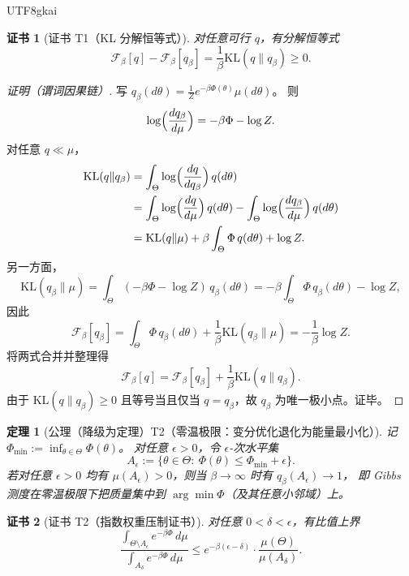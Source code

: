 \documentclass[12pt]{article}
\newtheorem{theorem}{定理}[section]
\newtheorem{Certificate}{证书}[section]
\begin{document}
\begin{CJK*}{UTF8}{gkai}
\begin{Certificate}[证书 T1（KL 分解恒等式）]
\label{cert:tex27-ch8-t1}
对任意可行 $q$，有分解恒等式
\[
  \mathcal{F}_\beta[q]-\mathcal{F}_\beta[q_\beta]
  =\frac{1}{\beta}\mathrm{KL}(q\|q_\beta)\ge 0.
\]
\end{Certificate}

\begin{proof}[证明（谓词因果链）]
写 $q_\beta(d\theta)=\frac{1}{Z}e^{-\beta\Phi(\theta)}\mu(d\theta)$。
则
\[
  \log\Bigl(\frac{dq_\beta}{d\mu}\Bigr)=-\beta\Phi-\log Z.
\]
	对任意 $q\ll\mu$，
	\begin{align*}
	  \mathrm{KL}(q\|q_\beta)
	  &=
	  \int_\Theta \log\Bigl(\frac{dq}{dq_\beta}\Bigr)\,q(d\theta)
	  \\
	  &=
	  \int_\Theta \log\Bigl(\frac{dq}{d\mu}\Bigr)\,q(d\theta)
	  -\int_\Theta \log\Bigl(\frac{dq_\beta}{d\mu}\Bigr)\,q(d\theta)
	  \\
	  &=
	  \mathrm{KL}(q\|\mu)+\beta\int_\Theta \Phi\,q(d\theta)+\log Z.
	\end{align*}
另一方面，
\[
  \mathrm{KL}(q_\beta\|\mu)=\int_\Theta (-\beta\Phi-\log Z)\,q_\beta(d\theta)
  =-\beta\int_\Theta \Phi\,q_\beta(d\theta)-\log Z,
\]
因此
\[
  \mathcal{F}_\beta[q_\beta]
  =\int_\Theta \Phi\,q_\beta(d\theta)+\frac{1}{\beta}\mathrm{KL}(q_\beta\|\mu)
  =-\frac{1}{\beta}\log Z.
\]
将两式合并并整理得
\[
  \mathcal{F}_\beta[q]
  =\mathcal{F}_\beta[q_\beta]+\frac{1}{\beta}\mathrm{KL}(q\|q_\beta).
\]
由于 $\mathrm{KL}(q\|q_\beta)\ge 0$ 且等号当且仅当 $q=q_\beta$，故 $q_\beta$ 为唯一极小点。证毕。
\end{proof}

\begin{theorem}[公理（降级为定理）T2（零温极限：变分优化退化为能量最小化）]
\label{thm:tex27-ch8-t2}
记 $\Phi_{\min}:=\inf_{\theta\in\Theta}\Phi(\theta)$。
对任意 $\epsilon>0$，令 $\epsilon$-次水平集
\[
  A_\epsilon:=\{\theta\in\Theta:\ \Phi(\theta)\le \Phi_{\min}+\epsilon\}.
\]
若对任意 $\epsilon>0$ 均有 $\mu(A_\epsilon)>0$，则当 $\beta\to\infty$ 时有 $q_\beta(A_\epsilon)\to 1$，
即 Gibbs 测度在零温极限下把质量集中到 $\arg\min\Phi$（及其任意小邻域）上。
\end{theorem}

\begin{Certificate}[证书 T2（指数权重压制证书）]
\label{cert:tex27-ch8-t2}
对任意 $0<\delta<\epsilon$，有比值上界
\[
  \frac{\int_{\Theta\setminus A_\epsilon} e^{-\beta\Phi}\,d\mu}{\int_{A_\delta} e^{-\beta\Phi}\,d\mu}
  \le e^{-\beta(\epsilon-\delta)}\cdot \frac{\mu(\Theta)}{\mu(A_\delta)}.
\]
\end{Certificate}


\end{CJK*}
\end{document}
